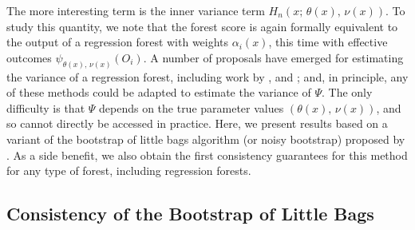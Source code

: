 \documentclass[aos]{imsart}
\theoremstyle{plain}
\theoremstyle{definition}
\theoremstyle{remark}
\begin{document}
\begin{CJK}{UTF8}{gbsn}
The more interesting term is the inner variance term $H_n(x; \, \theta(x), \, \nu(x))$. To
study this quantity, we note that the forest score
is again formally equivalent to the output of a regression forest with weights
$\alpha_i(x)$, this time with effective outcomes $\psi_{\theta(x), \, \nu(x)}(O_i)$.
A number of proposals have emerged for estimating the variance of a regression
forest, including work by \citet{sexton2009standard}, \citet{mentch2016quantifying}
and \citet{wager2014confidence}; and, in principle, any of these methods could be
adapted to estimate the variance of $\Psi$. The only difficulty is that $\Psi$ depends
on the true parameter values $(\theta(x), \, \nu(x))$, and so cannot directly be
accessed in practice.
Here, we present results based on a variant of the bootstrap of little bags algorithm (or noisy bootstrap) proposed
by \citet{sexton2009standard}. As a side benefit, we also obtain the first consistency guarantees for
this method for any type of forest, including regression forests.


\subsection{Consistency of the Bootstrap of Little Bags}
\label{sec:blb}


\end{CJK}
\end{document}
